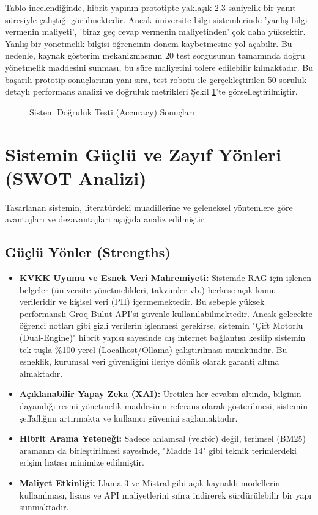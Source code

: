 \documentclass[12pt,a4paper]{report}
\begin{document}
Tablo incelendiğinde, hibrit yapının prototipte yaklaşık 2.3 saniyelik bir yanıt süresiyle çalıştığı görülmektedir. Ancak üniversite bilgi sistemlerinde 'yanlış bilgi vermenin maliyeti', 'biraz geç cevap vermenin maliyetinden' çok daha yüksektir. Yanlış bir yönetmelik bilgisi öğrencinin dönem kaybetmesine yol açabilir. Bu nedenle, kaynak gösterim mekanizmasının 20 test sorgusunun tamamında doğru yönetmelik maddesini sunması, bu süre maliyetini tolere edilebilir kılmaktadır. Bu başarılı prototip sonuçlarının yanı sıra, test robotu ile gerçekleştirilen 50 soruluk detaylı performans analizi ve doğruluk metrikleri Şekil \ref{fig:test_results}'te görselleştirilmiştir.

\newpage
\begin{figure}[H]
\centering
{}
\caption{Sistem Doğruluk Testi (Accuracy) Sonuçları}
\label{fig:test_results}
\end{figure}

\section{Sistemin Güçlü ve Zayıf Yönleri (SWOT Analizi)}
Tasarlanan sistemin, literatürdeki muadillerine ve geleneksel yöntemlere göre avantajları ve dezavantajları aşağıda analiz edilmiştir.

\subsection{Güçlü Yönler (Strengths)}
\begin{itemize}
    \item \textbf{KVKK Uyumu ve Esnek Veri Mahremiyeti:} Sistemde RAG için işlenen belgeler (üniversite yönetmelikleri, takvimler vb.) herkese açık kamu verileridir ve kişisel veri (PII) içermemektedir. Bu sebeple yüksek performanslı Groq Bulut API'si güvenle kullanılabilmektedir. Ancak gelecekte öğrenci notları gibi gizli verilerin işlenmesi gerekirse, sistemin "Çift Motorlu (Dual-Engine)" hibrit yapısı sayesinde dış internet bağlantısı kesilip sistemin tek tuşla \%100 yerel (Localhost/Ollama) çalıştırılması mümkündür. Bu esneklik, kurumsal veri güvenliğini ileriye dönük olarak garanti altına almaktadır.
    \item \textbf{Açıklanabilir Yapay Zeka (XAI):} Üretilen her cevabın altında, bilginin dayandığı resmi yönetmelik maddesinin referans olarak gösterilmesi, sistemin şeffaflığını artırmakta ve kullanıcı güvenini sağlamaktadır.
    \item \textbf{Hibrit Arama Yeteneği:} Sadece anlamsal (vektör) değil, terimsel (BM25) aramanın da birleştirilmesi sayesinde, "Madde 14" gibi teknik terimlerdeki erişim hatası minimize edilmiştir.
    \item \textbf{Maliyet Etkinliği:} Llama 3 ve Mistral gibi açık kaynaklı modellerin kullanılması, lisans ve API maliyetlerini sıfıra indirerek sürdürülebilir bir yapı sunmaktadır.
\end{itemize}
\end{document}
